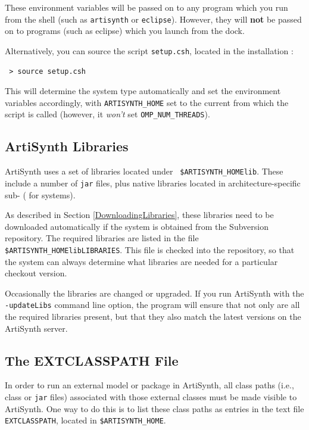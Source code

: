 These environment variables will be passed on to any program which you
run from the shell (such as {\tt artisynth} or {\tt eclipse}).
\ifMacOS
However, they will {\bf not} be passed on to programs (such as eclipse)
which you launch from the dock.
\fi

Alternatively, you can source the script {\tt setup.csh}, located in
the installation \directory:

\begin{verbatim}
 > source setup.csh
\end{verbatim}

This will determine the system type automatically and set the
environment variables accordingly, with {\tt ARTISYNTH\_HOME} set to the
current \directory from which the script is called (however,
it {\it won't} set {\tt OMP\_NUM\_THREADS}).
\fi

\subsection{ArtiSynth Libraries}

ArtiSynth uses a set of libraries located under {\tt
\$ARTISYNTH\_HOME\SEP lib}. These include a number of {\tt jar} files,
plus native libraries located in architecture-specific sub-\directories
({\tt \ARCH} for \FULLSYSTEM systems).

As described in Section \ref{DownloadingLibraries}, these libraries
need to be downloaded automatically if the system is obtained from the
Subversion repository. The required libraries are listed in the file
{\tt \$ARTISYNTH\_HOME\SEP lib\SEP LIBRARIES}. This file is checked
into the repository, so that the system can always determine what
libraries are needed for a particular checkout version.

Occasionally the libraries are changed or upgraded.  If you run
ArtiSynth with the {\tt -updateLibs} command line option, the program
will ensure that not only are all the required libraries present, but
that they also match the latest versions on the ArtiSynth server.

\subsection{The EXTCLASSPATH File}
\label{EXTCLASSPATHFile}

In order to run an external model or package in ArtiSynth, all class
paths (i.e., class \directories or {\tt jar} files) associated with
those external classes must be made visible to ArtiSynth. One way to
do this is to list these class paths as entries in the text file {\tt
EXTCLASSPATH}, located in {\tt \$ARTISYNTH\_HOME}.

